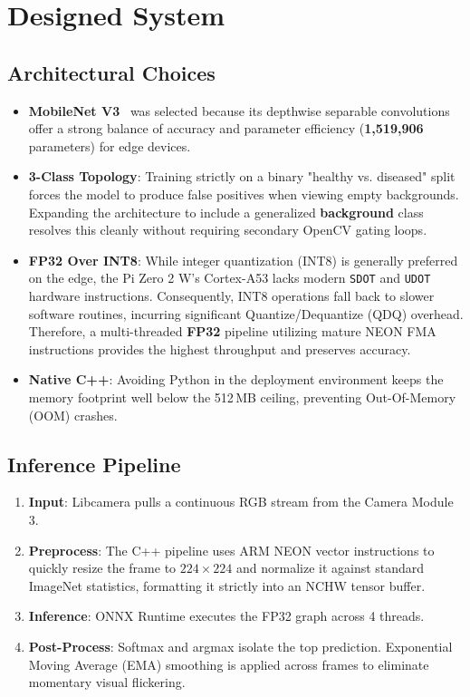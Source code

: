 \documentclass[a4paper,onesided,12pt]{report}
\begin{document}
\chapter{Designed System}

\section{Architectural Choices}

\begin{itemize}
\item \textbf{MobileNet V3}~\cite{howard2019mobilenetv3} was selected because its depthwise separable convolutions offer a strong balance of accuracy and parameter efficiency (\textbf{1{,}519{,}906} parameters) for edge devices.
\item \textbf{3-Class Topology}: Training strictly on a binary "healthy vs. diseased" split forces the model to produce false positives when viewing empty backgrounds. Expanding the architecture to include a generalized \textbf{background} class resolves this cleanly without requiring secondary OpenCV gating loops.
\item \textbf{FP32 Over INT8}: While integer quantization (INT8) is generally preferred on the edge, the Pi Zero 2 W's Cortex-A53 lacks modern \texttt{SDOT} and \texttt{UDOT} hardware instructions. Consequently, INT8 operations fall back to slower software routines, incurring significant Quantize/Dequantize (QDQ) overhead. Therefore, a multi-threaded \textbf{FP32} pipeline utilizing mature NEON FMA instructions provides the highest throughput and preserves accuracy.
\item \textbf{Native C++}: Avoiding Python in the deployment environment keeps the memory footprint well below the 512\,MB ceiling, preventing Out-Of-Memory (OOM) crashes.
\end{itemize}

\section{Inference Pipeline}

\begin{enumerate}
\item \textbf{Input}: Libcamera pulls a continuous RGB stream from the Camera Module 3.
\item \textbf{Preprocess}: The C++ pipeline uses ARM NEON vector instructions to quickly resize the frame to $224\times224$ and normalize it against standard ImageNet statistics, formatting it strictly into an NCHW tensor buffer.
\item \textbf{Inference}: ONNX Runtime executes the FP32 graph across 4 threads.
\item \textbf{Post-Process}: Softmax and argmax isolate the top prediction. Exponential Moving Average (EMA) smoothing is applied across frames to eliminate momentary visual flickering.
\end{enumerate}
\end{document}
